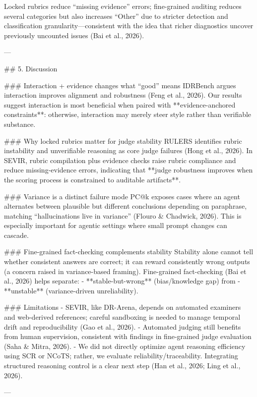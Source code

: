 Locked rubrics reduce “missing evidence” errors; fine-grained auditing reduces several categories but also increases “Other” due to stricter detection and classification granularity—consistent with the idea that richer diagnostics uncover previously uncounted issues (Bai et al., 2026).

---

## 5. Discussion  

### Interaction + evidence changes what “good” means  
IDRBench argues interaction improves alignment and robustness (Feng et al., 2026). Our results suggest interaction is most beneficial when paired with **evidence-anchored constraints**: otherwise, interaction may merely steer style rather than verifiable substance.

### Why locked rubrics matter for judge stability  
RULERS identifies rubric instability and unverifiable reasoning as core judge failures (Hong et al., 2026). In SEVIR, rubric compilation plus evidence checks raise rubric compliance and reduce missing-evidence errors, indicating that **judge robustness improves when the scoring process is constrained to auditable artifacts**.

### Variance is a distinct failure mode  
PC@k exposes cases where an agent alternates between plausible but different conclusions depending on paraphrase, matching “hallucinations live in variance” (Flouro & Chadwick, 2026). This is especially important for agentic settings where small prompt changes can cascade.

### Fine-grained fact-checking complements stability  
Stability alone cannot tell whether consistent answers are correct; it can reward consistently wrong outputs (a concern raised in variance-based framing). Fine-grained fact-checking (Bai et al., 2026) helps separate:
- **stable-but-wrong** (bias/knowledge gap) from  
- **unstable** (variance-driven unreliability).

### Limitations  
- SEVIR, like DR-Arena, depends on automated examiners and web-derived references; careful sandboxing is needed to manage temporal drift and reproducibility (Gao et al., 2026).  
- Automated judging still benefits from human supervision, consistent with findings in fine-grained judge evaluation (Saha & Mitra, 2026).  
- We did not directly optimize agent reasoning efficiency using SCR or NCoTS; rather, we evaluate reliability/traceability. Integrating structured reasoning control is a clear next step (Han et al., 2026; Ling et al., 2026).

---

